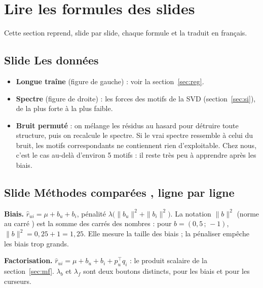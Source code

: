 \documentclass[11pt,a4paper]{article}
\newcommand{\rhat}{\hat r}
\begin{document}
\section{Lire les formules des slides}

Cette section reprend, slide par slide, chaque formule et la traduit en français.

\subsection{Slide \og Les données \fg}

\begin{itemize}
  \item \textbf{Longue traîne} (figure de gauche) : voir la section~\ref{sec:reg}.
  \item \textbf{Spectre} (figure de droite) : les forces des motifs de la SVD
        (section~\ref{sec:si}), de la plus forte à la plus faible.
  \item \textbf{Bruit permuté} : on mélange les résidus au hasard pour détruire toute
        structure, puis on recalcule le spectre. Si le vrai spectre ressemble à celui du
        bruit, les motifs correspondants ne contiennent rien d'exploitable. Chez nous,
        c'est le cas au-delà d'environ 5 motifs : il reste très peu à apprendre après les biais.
\end{itemize}

\subsection{Slide \og Méthodes comparées \fg, ligne par ligne}

\textbf{Biais.} $\rhat_{ui} = \mu + b_u + b_i$, pénalité
$\lambda\bigl(\|b_u\|^2 + \|b_i\|^2\bigr)$.
La notation $\|b\|^2$ (\og norme au carré \fg) est la somme des carrés des nombres :
pour $b = (0{,}5 \,;\, -1)$, $\|b\|^2 = 0{,}25 + 1 = 1{,}25$. Elle mesure la \og taille \fg
des biais ; la pénaliser empêche les biais trop grands.

\textbf{Factorisation.} $\rhat_{ui} = \mu + b_u + b_i + p_u^\top q_i$ : le produit
scalaire de la section~\ref{sec:mf}. $\lambda_b$ et $\lambda_f$ sont deux boutons
distincts, pour les biais et pour les curseurs.
\end{document}
